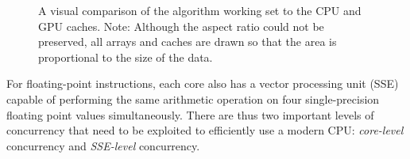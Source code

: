 \begin{figure}
\centering
{}
\label{fig:caches}
\caption{A visual comparison of the algorithm working set to the CPU and GPU
caches.  Note: Although the aspect ratio could not be preserved, all arrays and
caches are drawn so that the area is proportional to the size of the data. } 
\end{figure}


For floating-point instructions, each core also has a vector processing unit
(SSE) capable of performing the same arithmetic operation on four single-precision 
floating point values simultaneously.
There are thus two important levels of concurrency that need to be exploited to
efficiently use a modern CPU: {\em core-level} concurrency and {\em SSE-level}
concurrency. 

